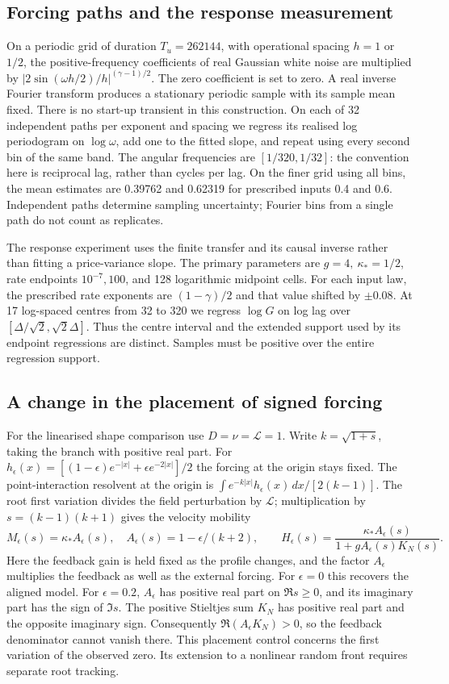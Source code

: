 \documentclass[11pt]{article}
\begin{document}
\subsection{Forcing paths and the response measurement}
On a periodic grid of duration \(T_u=262144\), with operational spacing
\(h=1\) or \(1/2\), the positive-frequency coefficients of real Gaussian
white noise are multiplied by
\( |2\sin(\omega h/2)/h|^{(\gamma-1)/2}\).
The zero coefficient is set to zero. A real inverse Fourier transform
produces a stationary periodic sample with its sample mean fixed. There is
no start-up transient in this construction. On each of 32 independent
paths per exponent and spacing we regress its realised log periodogram on
\(\log\omega\), add one to the fitted slope, and repeat using every second
bin of the same band. The angular frequencies are \([1/320,1/32]\):
the convention here is reciprocal lag, rather than cycles per lag. On the
finer grid using all bins, the mean estimates are 0.39762 and 0.62319 for
prescribed inputs 0.4 and 0.6. Independent paths determine sampling
uncertainty; Fourier bins from a single path do not count as replicates.

The response experiment uses the finite transfer and its causal inverse
rather than fitting a price-variance slope. The primary parameters are
\(g=4,\ \kappa_*=1/2\), rate endpoints \(10^{-7},100\), and 128
logarithmic midpoint cells. For each input law, the prescribed rate
exponents are \((1-\gamma)/2\) and that value shifted by \(\pm0.08\).
At 17 log-spaced centres from 32 to 320 we regress \(\log G\) on log lag
over \([\Delta/\sqrt2,\sqrt2\Delta]\). Thus the centre interval and the
extended support used by its endpoint regressions are distinct. Samples
must be positive over the entire regression support.

\subsection{A change in the placement of signed forcing}
For the linearised shape comparison use \(D=\nu=\mathcal L=1\).
Write \(k=\sqrt{1+s}\), taking the branch with positive real part.
For \(h_\epsilon(x)=[(1-\epsilon)e^{-|x|}+\epsilon e^{-2|x|}]/2\)
the forcing at the origin stays fixed. The point-interaction resolvent at
the origin is \(\int e^{-k|x|}h_\epsilon(x)\,dx/[2(k-1)]\).
The root first variation divides the field perturbation by
\(\mathcal L\); multiplication by \(s=(k-1)(k+1)\) gives the velocity
mobility
\[
 M_\epsilon(s)=\kappa_* A_\epsilon(s),\quad
 A_\epsilon(s)=1-\epsilon/(k+2),\qquad
 H_\epsilon(s)=\frac{\kappa_* A_\epsilon(s)}
 {1+g A_\epsilon(s)K_N(s)} .
\]
Here the feedback gain is held fixed as the profile changes, and the factor
\(A_\epsilon\) multiplies the feedback as well as the external forcing.
For \(\epsilon=0\) this recovers the aligned model. For
\(\epsilon=0.2\), \(A_\epsilon\) has positive real part on
\(\Re s\ge0\), and its imaginary part has the sign of \(\Im s\).
The positive Stieltjes sum \(K_N\) has positive real part and the opposite
imaginary sign. Consequently \(\Re(A_\epsilon K_N)>0\), so the feedback
denominator cannot vanish there. This placement control concerns the
first variation of the observed zero. Its extension to a nonlinear
random front requires separate root tracking.
\end{document}
